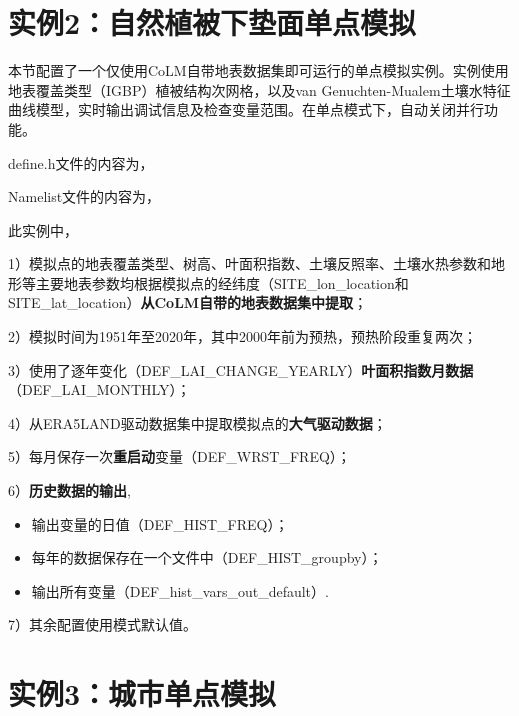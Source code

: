 \documentclass[a4paper,12pt,twoside]{article}
\begin{document}
\section{实例2：自然植被下垫面单点模拟}

本节配置了一个仅使用CoLM自带地表数据集即可运行的单点模拟实例。实例使用地表覆盖类型（IGBP）植被结构次网格，以及van Genuchten-Mualem土壤水特征曲线模型，实时输出调试信息及检查变量范围。在单点模式下，自动关闭并行功能。

define.h文件的内容为，


Namelist文件的内容为，


此实例中，\par
1）模拟点的地表覆盖类型、树高、叶面积指数、土壤反照率、土壤水热参数和地形等主要地表参数均根据模拟点的经纬度（SITE\_lon\_location和SITE\_lat\_location）\textbf{从CoLM自带的地表数据集中提取}；\par
2）模拟时间为1951年至2020年，其中2000年前为预热，预热阶段重复两次；\par
3）使用了逐年变化（DEF\_LAI\_CHANGE\_YEARLY）\textbf{叶面积指数月数据}\\ （DEF\_LAI\_MONTHLY）；\par
4）从ERA5LAND驱动数据集中提取模拟点的\textbf{大气驱动数据}；\par
5）每月保存一次\textbf{重启动}变量（DEF\_WRST\_FREQ）；\par
6）\textbf{历史数据的输出},
\begin{itemize}[nosep,leftmargin=4em]
    \item 输出变量的日值（DEF\_HIST\_FREQ）；
    \item 每年的数据保存在一个文件中（DEF\_HIST\_groupby）；
    \item 输出所有变量（DEF\_hist\_vars\_out\_default）.
\end{itemize} \par
7）其余配置使用模式默认值。

\section{实例3：城市单点模拟}
\end{document}
